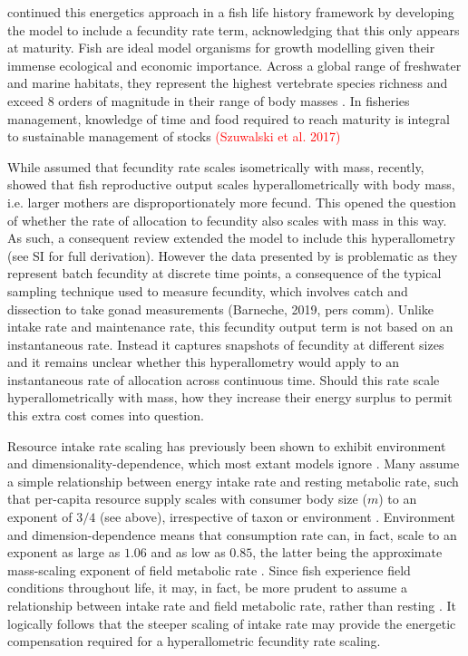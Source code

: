 \documentclass[a4paper]{article} %
\begin{document}
    \cite{Charnov2001} continued this energetics approach in a fish life history framework by developing the \cite{West2001} model to include a fecundity rate term, acknowledging that this only appears at maturity. Fish are ideal model organisms for growth modelling given their immense ecological and economic importance. Across a global range of freshwater and marine habitats, they represent the highest vertebrate species richness and exceed 8 orders of magnitude in their range of body masses \autocite{Barneche2018c}. In fisheries management, knowledge of time  and food required to reach maturity is integral to sustainable management of stocks \textcolor{red}{(Szuwalski et al. 2017)}
    
    While \cite{Charnov2001} assumed that fecundity rate scales isometrically with mass, recently, \cite{Barneche2018-reproductive_output} showed that fish reproductive output scales hyperallometrically with body mass, i.e. larger mothers are disproportionately more fecund. This opened the question of whether the rate of allocation to fecundity also scales with mass in this way. As such, a consequent review extended the \cite{Charnov2001} model to include this hyperallometry \autocite{Marshall2019b} (see SI for full derivation). However the data presented by \cite{Barneche2018-reproductive_output} is problematic as they represent batch fecundity at discrete time points, a consequence of the typical sampling technique used to measure fecundity, which involves catch and dissection to take gonad measurements (Barneche, 2019, pers comm). Unlike intake rate and maintenance rate, this fecundity output term is not based on an instantaneous rate. Instead it captures snapshots of fecundity at different sizes and it remains unclear whether this hyperallometry would apply to an instantaneous rate of allocation across continuous time. Should this rate scale hyperallometrically with mass, how they increase their energy surplus to permit this extra cost comes into question.

    Resource intake rate scaling has previously been shown to exhibit environment and dimensionality-dependence, which most extant models ignore \autocite{Pawar2012}. Many assume a simple relationship between energy intake rate and resting metabolic rate, such that per-capita resource supply scales with consumer body size ($m$) to an exponent of $3/4$ (see above), irrespective of taxon or environment \autocite{Pawar2012}. Environment and dimension-dependence means that consumption rate can, in fact, scale to an exponent as large as $1.06$ and as low as $0.85$, the latter being the approximate mass-scaling exponent of field metabolic rate \autocite{peters1983,Weibel2004, Pawar2012}. Since fish experience field conditions throughout life, it may, in fact, be more prudent to assume a relationship between intake rate and field metabolic rate, rather than resting \autocite{Boisclair1993}. It logically follows that the steeper scaling of intake rate may provide the energetic compensation required for a hyperallometric fecundity rate scaling.
\end{document}
